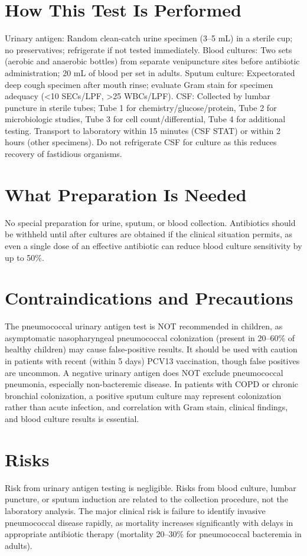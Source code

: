 \section*{How This Test Is Performed}
Urinary antigen: Random clean-catch urine specimen (3--5 mL) in a sterile cup; no preservatives; refrigerate if not tested immediately. Blood cultures: Two sets (aerobic and anaerobic bottles) from separate venipuncture sites before antibiotic administration; 20 mL of blood per set in adults. Sputum culture: Expectorated deep cough specimen after mouth rinse; evaluate Gram stain for specimen adequacy (<10 SECs/LPF, >25 WBCs/LPF). CSF: Collected by lumbar puncture in sterile tubes; Tube 1 for chemistry/glucose/protein, Tube 2 for microbiologic studies, Tube 3 for cell count/differential, Tube 4 for additional testing. Transport to laboratory within 15 minutes (CSF STAT) or within 2 hours (other specimens). Do not refrigerate CSF for culture as this reduces recovery of fastidious organisms.

\section*{What Preparation Is Needed}
No special preparation for urine, sputum, or blood collection. Antibiotics should be withheld until after cultures are obtained if the clinical situation permits, as even a single dose of an effective antibiotic can reduce blood culture sensitivity by up to 50\%.

\section*{Contraindications and Precautions}
The pneumococcal urinary antigen test is NOT recommended in children, as asymptomatic nasopharyngeal pneumococcal colonization (present in 20--60\% of healthy children) may cause false-positive results. It should be used with caution in patients with recent (within 5 days) PCV13 vaccination, though false positives are uncommon. A negative urinary antigen does NOT exclude pneumococcal pneumonia, especially non-bacteremic disease. In patients with COPD or chronic bronchial colonization, a positive sputum culture may represent colonization rather than acute infection, and correlation with Gram stain, clinical findings, and blood culture results is essential.

\section*{Risks}
Risk from urinary antigen testing is negligible. Risks from blood culture, lumbar puncture, or sputum induction are related to the collection procedure, not the laboratory analysis. The major clinical risk is failure to identify invasive pneumococcal disease rapidly, as mortality increases significantly with delays in appropriate antibiotic therapy (mortality 20--30\% for pneumococcal bacteremia in adults).

